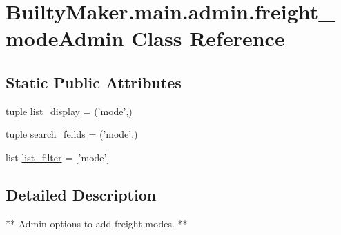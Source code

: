 \hypertarget{classBuiltyMaker_1_1main_1_1admin_1_1freight__modeAdmin}{\section{\-Builty\-Maker.\-main.\-admin.\-freight\-\_\-mode\-Admin \-Class \-Reference}
\label{classBuiltyMaker_1_1main_1_1admin_1_1freight__modeAdmin}
}
\subsection*{\-Static \-Public \-Attributes}
\begin{DoxyCompactItemize}
\item 
tuple \hyperlink{classBuiltyMaker_1_1main_1_1admin_1_1freight__modeAdmin_a35ba2b7e7d850303293c80275ce13e2b}{list\-\_\-display} = ('mode',)
\item 
tuple \hyperlink{classBuiltyMaker_1_1main_1_1admin_1_1freight__modeAdmin_a2702ca876d6dc56db09ca156c9b80f4e}{search\-\_\-feilds} = ('mode',)
\item 
list \hyperlink{classBuiltyMaker_1_1main_1_1admin_1_1freight__modeAdmin_a85751e46bc2d5812da3e0fac580ecb80}{list\-\_\-filter} = \mbox{[}'mode'\mbox{]}
\end{DoxyCompactItemize}


\subsection{\-Detailed \-Description}
\begin{DoxyVerb}
    ** Admin options to add freight modes. **
\end{DoxyVerb}
 

